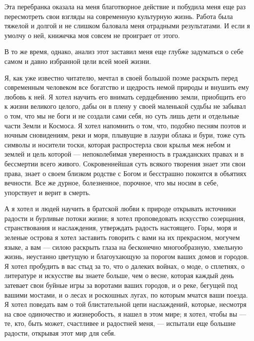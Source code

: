 Эта перебранка оказала  на меня благотворное действие  и побудила меня
еще  раз пересмотреть  свои взгляды  на современную  культурную жизнь.
Работа  была тяжелой  и долгой  и не  слишком баловала  меня отрадными
результатами. И если я умолчу о  ней, книжечка моя совсем не проиграет
от этого.

В то же время, однако, анализ этот заставил меня еще глубже задуматься
о себе самом и давно избранной цели всей моей жизни.

Я, как  уже известно читателю,  мечтал в своей большой  поэме раскрыть
перед современным человеком  все богатство и щедрость  немой природы и
внушить ему  любовь к  ней. Я хотел  научить его  внимать сердцебиению
земли, приобщить его к жизни великого  целого, дабы он в плену у своей
маленькой судьбы не  забывал о том, что  мы не боги и  не создали сами
себя, но  суть лишь дети  и отдельные части  Земли и Космоса.  Я хотел
напомнить о том, что, подобно песням поэтов и ночным сновидениям, реки
и моря, плывущие в лазури облака  и бури, тоже суть символы и носители
тоски,  которая распростерла  свои крылья  меж небом  и землей  и цель
которой  ---  непоколебимая  уверенность  в  гражданских  правах  и  в
бессмертии всего  живого. Сокровеннейшая  суть всякого  творения знает
эти свои  права, знает о  своем близком  родстве с Богом  и бесстрашно
покоится в  объятиях вечности.  Все же дурное,  болезненное, порочное,
что мы носим в себе, упорствует и верит в смерть.

А  я хотел  и  людей  научить в  братской  любви  к природе  открывать
источники  радости  и бурливые  потоки  жизни;  я хотел  проповедовать
искусство созерцания, странствования и наслаждения, утверждать радость
настоящего. Горы, моря и зеленые  острова я хотел заставить говорить с
вами на их  прекрасном, могучем языке, а вам ---  силою раскрыть глаза
на  бесконечно многообразную,  хмельную  жизнь,  неустанно цветущую  и
благоухающую за порогом ваших домов и городов. Я хотел пробудить в вас
стыд за то, что  о далеких войнах, о моде, о  сплетнях, о литературе и
искусстве вы знаете больше, чем  о весне, которая каждый день затевает
свои буйные  игры за  воротами ваших  городов, и  о реке,  бегущей под
вашими мостами,  и о лесах и  роскошных лугах, по которым  мчатся ваши
поезда. Я  хотел поведать  вам о  той блистательной  цепи наслаждений,
которые, несмотря на  свое одиночество и жизнеробость, я  нашел в этом
мире;  я  хотел, чтобы  вы  ---  те,  кто,  быть может,  счастливее  и
радостней меня,  --- испытали еще  большие радости, открывая  этот мир
для себя.

